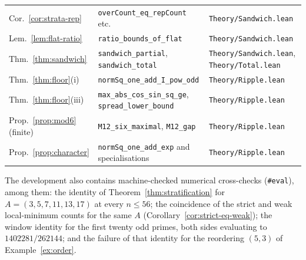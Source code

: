 \documentclass[11pt,a4paper]{article}
\theoremstyle{plain}
\theoremstyle{definition}
\theoremstyle{remark}
\newcommand{\Lean}[1]{\texttt{#1}}
\begin{document}
\begin{center}
\begin{tabular}{lll}
Cor.~\ref{cor:strata-rep} & \Lean{overCount\_eq\_repCount} etc. & \Lean{Theory/Sandwich.lean}\\
Lem.~\ref{lem:flat-ratio} & \Lean{ratio\_bounds\_of\_flat} & \Lean{Theory/Sandwich.lean}\\
Thm.~\ref{thm:sandwich} & \Lean{sandwich\_partial}, \Lean{sandwich\_total} & \Lean{Theory/Sandwich.lean}, \Lean{Theory/Total.lean}\\
Thm.~\ref{thm:floor}(i) & \Lean{normSq\_one\_add\_I\_pow\_odd} & \Lean{Theory/Ripple.lean}\\
Thm.~\ref{thm:floor}(iii) & \Lean{max\_abs\_cos\_sin\_sq\_ge}, \Lean{spread\_lower\_bound} & \Lean{Theory/Ripple.lean}\\
Prop.~\ref{prop:mod6} (finite) & \Lean{M12\_six\_maximal}, \Lean{M12\_gap} & \Lean{Theory/Ripple.lean}\\
Prop.~\ref{prop:character} & \Lean{normSq\_one\_add\_exp} and specialisations & \Lean{Theory/Ripple.lean}\\
\bottomrule
\end{tabular}
\end{center}

The development also contains machine-checked numerical cross-checks
(\Lean{\#eval}), among them: the identity of Theorem~\ref{thm:stratification}
for $A=(3,5,7,11,13,17)$ at every $n\le56$; the coincidence of the strict and
weak local-minimum counts for the same $A$
(Corollary~\ref{cor:strict-eq-weak}); the window identity for the first twenty
odd primes, both sides evaluating to $1402281/262144$; and the failure of that
identity for the reordering $(5,3)$ of Example~\ref{ex:order}.
\end{document}
